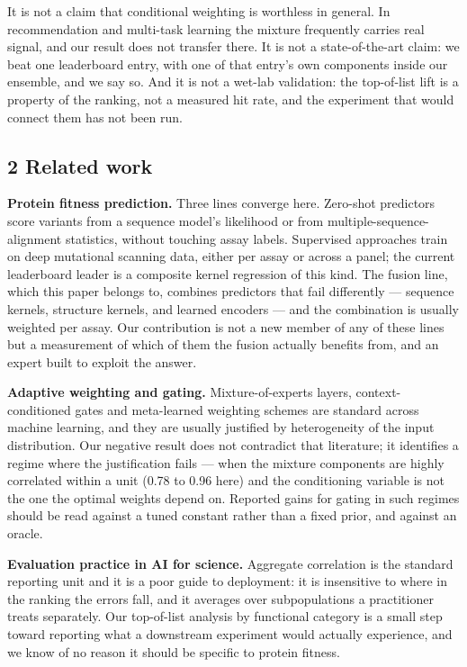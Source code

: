 It is not a claim that conditional weighting is worthless in general. In recommendation and multi-task
learning the mixture frequently carries real signal, and our result does not transfer there. It is not a
state-of-the-art claim: we beat one leaderboard entry, with one of that entry's own components inside our
ensemble, and we say so. And it is not a wet-lab validation: the top-of-list lift is a property of the
ranking, not a measured hit rate, and the experiment that would connect them has not been run.

\hypertarget{related-work}{%
\subsection{2 Related work}\label{related-work}}

\textbf{Protein fitness prediction.} Three lines converge here. Zero-shot predictors score variants from a
sequence model's likelihood or from multiple-sequence-alignment statistics, without touching assay
labels. Supervised approaches train on deep mutational scanning data, either per assay or across a
panel; the current leaderboard leader is a composite kernel regression of this kind. The fusion line,
which this paper belongs to, combines predictors that fail differently --- sequence kernels, structure
kernels, and learned encoders --- and the combination is usually weighted per assay. Our contribution is
not a new member of any of these lines but a measurement of which of them the fusion actually benefits
from, and an expert built to exploit the answer.

\textbf{Adaptive weighting and gating.} Mixture-of-experts layers, context-conditioned gates and meta-learned
weighting schemes are standard across machine learning, and they are usually justified by heterogeneity
of the input distribution. Our negative result does not contradict that literature; it identifies a
regime where the justification fails --- when the mixture components are highly correlated within a unit
(0.78 to 0.96 here) and the conditioning variable is not the one the optimal weights depend on. Reported
gains for gating in such regimes should be read against a tuned constant rather than a fixed prior, and
against an oracle.

\textbf{Evaluation practice in AI for science.} Aggregate correlation is the standard reporting unit and it
is a poor guide to deployment: it is insensitive to where in the ranking the errors fall, and it
averages over subpopulations a practitioner treats separately. Our top-of-list analysis by functional
category is a small step toward reporting what a downstream experiment would actually experience, and we
know of no reason it should be specific to protein fitness.

